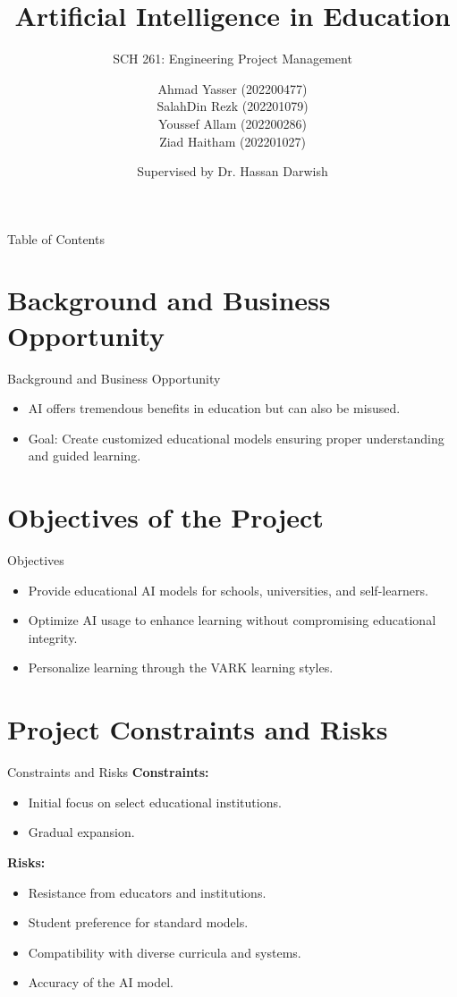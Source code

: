 \documentclass[aspectratio=169]{beamer}
\title[AI in Education]{Artificial Intelligence in Education}
\subtitle{SCH 261: Engineering Project Management}
\author{
  Ahmad Yasser (202200477) \\
  SalahDin Rezk (202201079) \\
  Youssef Allam (202200286) \\
  Ziad Haitham (202201027)
}
\date{Supervised by Dr. Hassan Darwish}
\begin{document}
\begin{frame}
  \titlepage
\end{frame}

\begin{frame}{Table of Contents}
  \tableofcontents
\end{frame}

\section{Background and Business Opportunity}
\begin{frame}{Background and Business Opportunity}
  \begin{itemize}
    \item AI offers tremendous benefits in education but can also be misused.
    \item Goal: Create customized educational models ensuring proper understanding and guided learning.
  \end{itemize}
\end{frame}

\section{Objectives of the Project}
\begin{frame}{Objectives}
  \begin{itemize}
    \item Provide educational AI models for schools, universities, and self-learners.
    \item Optimize AI usage to enhance learning without compromising educational integrity.
    \item Personalize learning through the VARK learning styles.
  \end{itemize}
\end{frame}

\section{Project Constraints and Risks}
\begin{frame}{Constraints and Risks}
  \textbf{Constraints:}
  \begin{itemize}
    \item Initial focus on select educational institutions.
    \item Gradual expansion.
  \end{itemize}
  \textbf{Risks:}
  \begin{itemize}
    \item Resistance from educators and institutions.
    \item Student preference for standard models.
    \item Compatibility with diverse curricula and systems.
    \item Accuracy of the AI model.
  \end{itemize}
\end{frame}
\end{document}
